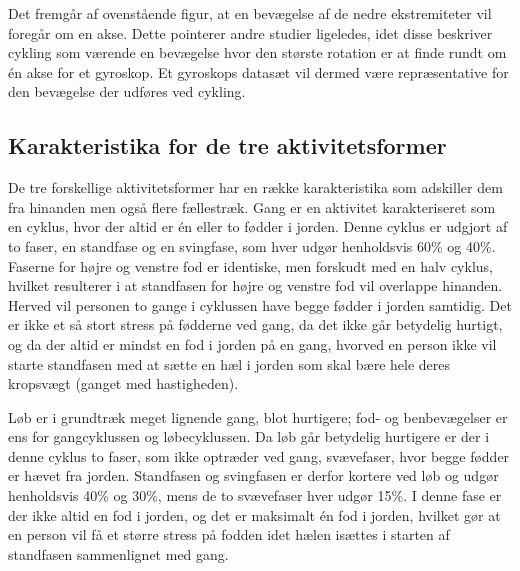 Det fremgår af ovenstående figur, at en bevægelse af de nedre ekstremiteter vil foregår om en akse. Dette pointerer andre studier ligeledes, idet disse beskriver cykling som værende en bevægelse hvor den største rotation er at finde rundt om én akse for et gyroskop. Et gyroskops datasæt vil dermed være repræsentative for den bevægelse der udføres ved cykling. \citep{Cockcroft2011,Marin-PerianuMarin-Perianu2013}



\subsection{Karakteristika for de tre aktivitetsformer}



De tre forskellige aktivitetsformer har en række karakteristika som adskiller dem fra hinanden men også flere fællestræk. \newline 
Gang er en aktivitet karakteriseret som en cyklus, hvor der altid er én eller to fødder i jorden. Denne cyklus er udgjort af to faser, en standfase og en svingfase, som hver udgør henholdsvis 60\% og 40\%.
Faserne for højre og venstre fod er identiske, men forskudt med en halv cyklus, hvilket resulterer i at standfasen for højre og venstre fod vil overlappe hinanden. Herved vil personen to gange i cyklussen have begge fødder i jorden samtidig. \newline
Det er ikke et så stort stress på fødderne ved gang, da det ikke går betydelig hurtigt, og da der altid er mindst en fod i jorden på en gang, hvorved en person ikke vil starte standfasen med at sætte en hæl i jorden som skal bære hele deres kropsvægt (ganget med hastigheden).

Løb er i grundtræk meget lignende gang, blot hurtigere; fod- og benbevægelser er ens for gangcyklussen og løbecyklussen. Da løb går betydelig hurtigere er der i denne cyklus to faser, som ikke optræder ved gang, svævefaser, hvor begge fødder er hævet fra jorden. Standfasen og svingfasen er derfor kortere ved løb og udgør henholdsvis 40\% og 30\%, mens de to svævefaser hver udgør 15\%. \newline
I denne fase er der ikke altid en fod i jorden, og det er maksimalt én fod i jorden, hvilket gør at en person vil få et større stress på fodden idet hælen isættes i starten af standfasen sammenlignet med gang.

